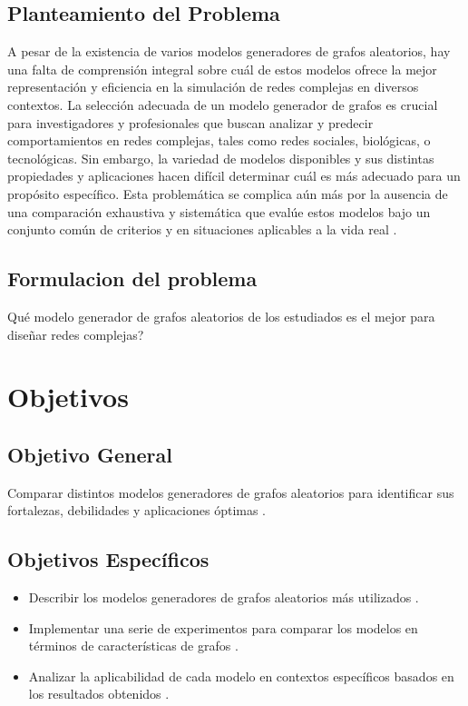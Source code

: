 \subsection{Planteamiento del Problema}
A pesar de la existencia de varios modelos generadores de grafos aleatorios, hay una falta de comprensión integral sobre cuál de estos modelos ofrece la mejor representación y eficiencia en la simulación de redes complejas en diversos contextos. La selección adecuada de un modelo generador de grafos es crucial para investigadores y profesionales que buscan analizar y predecir comportamientos en redes complejas, tales como redes sociales, biológicas, o tecnológicas. Sin embargo, la variedad de modelos disponibles y sus distintas propiedades y aplicaciones hacen difícil determinar cuál es más adecuado para un propósito específico. Esta problemática se complica aún más por la ausencia de una comparación exhaustiva y sistemática que evalúe estos modelos bajo un conjunto común de criterios y en situaciones aplicables a la vida real \citep{Wilson2008, Bollobas2001, Caldarelli2007} .

\subsection{Formulacion del problema}
\textquestiondown Qu\'e modelo generador de grafos aleatorios de los estudiados es el mejor para diseñar redes complejas?


\section{Objetivos}
\subsection{Objetivo General}
Comparar distintos modelos generadores de grafos aleatorios para identificar sus fortalezas, debilidades y aplicaciones óptimas .
\subsection{Objetivos Específicos}
\begin{itemize}
    \item Describir los modelos generadores de grafos aleatorios más utilizados .
    \item Implementar una serie de experimentos para comparar los modelos en términos de características de grafos .
    \item Analizar la aplicabilidad de cada modelo en contextos específicos basados en los resultados obtenidos .
\end{itemize}


